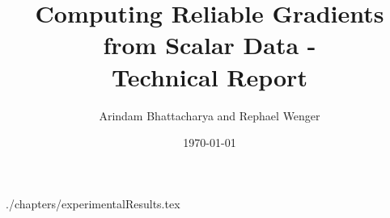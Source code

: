 \documentclass[journal]{vgtc}                %
\title{Computing Reliable Gradients from Scalar Data -
\protect\\ Technical Report}
\date{\currenttime \today}
\author{Arindam Bhattacharya and Rephael Wenger}
\begin{document}


\maketitle






 {./chapters/experimentalResults.tex}




\appendix
\newpage


\end{document}
